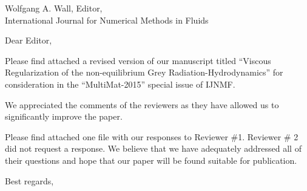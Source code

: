 
        \addtolength{\topmargin}{-4.0cm}    %
       \addtolength{\textheight}{7.5cm}    %

\address{Jean Ragusa\\ 
Department of Nuclear Engineering \\
Texas A\&M University\\
College Station, TX 77843-3133, USA\\
phone: (979) 862 2033\\
e-mail: jean.ragusa@tamu.edu \vspace{0.5cm}}


\signature{\vspace{-1.25cm}Marc-Olivier Delchini, Jean Ragusa, Jim Ferguson}   




\begin{letter}{
    Wolfgang A. Wall, Editor,\\
    International Journal for Numerical Methods in Fluids}
\date{\today}

\opening{Dear Editor,}
         \vspace{0.25cm}

Please find attached a revised version of our manuscript titled ``Viscous Regularization of the non-equilibrium Grey Radiation-Hydrodynamics'' for consideration in the ``MultiMat-2015'' special issue of IJNMF. 

We appreciated the comments of the reviewers as they have allowed us to significantly improve the paper.


Please find attached one file with our responses to Reviewer \#1. Reviewer \# 2 did not request a response. We believe that we have adequately addressed all of their questions and hope that our paper will be found suitable for publication.




\closing{Best regards, }

\end{letter}


